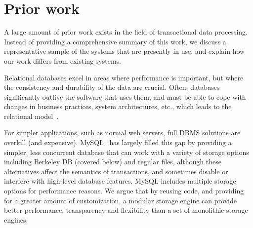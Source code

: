 \documentclass[10pt,letterpaper,twocolumn,english]{article}
\newcommand{\yad}{Lemon\xspace}
\begin{document}
\section{Prior work}

A large amount of prior work exists in the field of transactional data
processing.  Instead of providing a comprehensive summary of this
work, we discuss a representative sample of the systems that are
presently in use, and explain how our work differs from existing
systems.




Relational databases excel in areas
where performance is important, but where the consistency and
durability of the data are crucial.  Often, databases significantly
outlive the software that uses them, and must be able to cope with
changes in business practices, system architectures,
etc., which leads to the relational model~\cite{relational}.

For simpler applications, such as normal web servers, full DBMS
solutions are overkill (and expensive).  MySQL~\cite{mysql} has
largely filled this gap by providing a simpler, less concurrent
database that can work with a variety of storage options including
Berkeley DB (covered below) and regular files, although these
alternatives affect the semantics of transactions, and sometimes 
disable or interfere with high-level database features.  MySQL 
includes multiple storage options for performance reasons.  
We argue that by reusing code, and providing for a greater amount 
of customization, a modular storage engine can provide better 
performance, transparency and flexibility than a 
set of monolithic storage engines.

\end{document}
